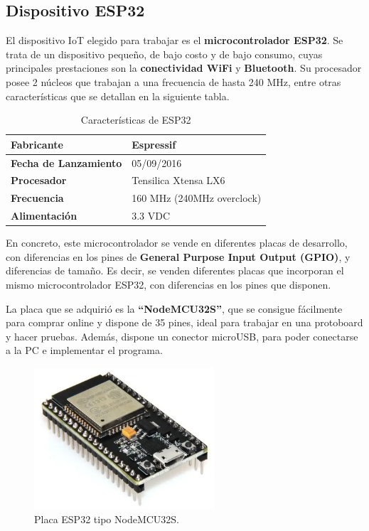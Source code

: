 \subsection{Dispositivo ESP32}
El dispositivo IoT elegido para trabajar es el \textbf{microcontrolador ESP32}. Se trata de un dispositivo pequeño, de bajo costo y de bajo consumo, cuyas principales prestaciones son la \textbf{conectividad WiFi} y \textbf{Bluetooth}. Su procesador posee 2 núcleos que trabajan a una frecuencia de hasta 240 MHz, entre otras características que se detallan en la siguiente tabla.

\begin{table}[h]
\begin{center}
\begin{tabular}{ll}
\hline
\multicolumn{1}{|l|}{\textbf{Fabricante}} & \multicolumn{1}{l|}{Espressif} \\ \hline
\multicolumn{1}{|l|}{\textbf{Fecha de Lanzamiento}} & \multicolumn{1}{l|}{05/09/2016} \\ \hline
\multicolumn{1}{|l|}{\textbf{Procesador}} & \multicolumn{1}{l|}{Tensilica Xtensa LX6} \\ \hline
\multicolumn{1}{|l|}{\textbf{Frecuencia}} & \multicolumn{1}{l|}{160 MHz (240MHz overclock)} \\ \hline
\multicolumn{1}{|l|}{\textbf{Alimentación}} & \multicolumn{1}{l|}{3.3 VDC} \\ \hline           
\end{tabular}
\caption{Características de ESP32}
\label{tab:car-esp32}
\end{center}
\end{table}

En concreto, este microcontrolador se vende en diferentes placas de desarrollo, con diferencias en los pines de \textbf{General Purpose Input Output (GPIO)}, y diferencias de tamaño. Es decir, se venden diferentes placas que incorporan el mismo microcontrolador ESP32, con diferencias en los pines que disponen.

La placa que se adquirió es la \textbf{“NodeMCU32S”}, que se consigue fácilmente para comprar online y dispone de 35 pines, ideal para trabajar en una protoboard y hacer pruebas. Además, dispone un conector microUSB, para poder conectarse a la PC e implementar el programa.

\begin{figure}[H]
    \centering
    \includegraphics[width=0.6\textwidth]{fig/esp32_1.png}
    \caption{Placa ESP32 tipo NodeMCU32S.}
    \label{fig:esp32_1}
\end{figure}

